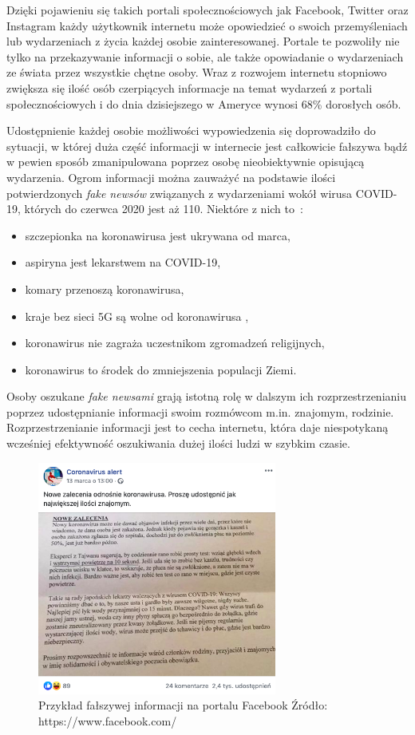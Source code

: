 Dzięki pojawieniu się takich portali społecznościowych jak Facebook, Twitter oraz Instagram każdy użytkownik
internetu może opowiedzieć o swoich przemyśleniach lub wydarzeniach z życia każdej osobie zainteresowanej. Portale te
pozwoliły nie tylko na przekazywanie informacji o sobie, ale także opowiadanie o wydarzeniach ze świata przez wszystkie
chętne osoby. Wraz z rozwojem internetu stopniowo zwiększa się ilość osób czerpiących informacje na temat wydarzeń
z portali społecznościowych i do dnia dzisiejszego w Ameryce wynosi 68\% dorosłych osób. 

Udostępnienie każdej osobie możliwości wypowiedzenia się doprowadziło do sytuacji, w której duża część informacji w internecie
jest całkowicie fałszywa bądź w pewien sposób zmanipulowana poprzez osobę nieobiektywnie opisującą wydarzenia. Ogrom informacji
można zauważyć na podstawie ilości potwierdzonych \textit{fake newsów} związanych z wydarzeniami wokół wirusa COVID-19, których do 
czerwca 2020 jest aż 110. Niektóre z nich to~\cite{Korona}:
\begin{itemize}
    \item szczepionka na koronawirusa jest ukrywana od marca,
    \item aspiryna jest lekarstwem na COVID-19,
    \item komary przenoszą koronawirusa,
    \item kraje bez sieci 5G są wolne od koronawirusa ,
    \item koronawirus nie zagraża uczestnikom zgromadzeń religijnych,
    \item koronawirus to środek do zmniejszenia populacji Ziemi.
\end{itemize}
Osoby oszukane \textit{fake newsami} grają istotną rolę w dalszym ich rozprzestrzenianiu poprzez udostępnianie informacji swoim rozmówcom
m.in. znajomym, rodzinie. Rozprzestrzenianie informacji jest to cecha internetu, która daje niespotykaną wcześniej efektywność oszukiwania dużej ilości ludzi w szybkim
czasie. 
\begin{figure}[h!]
    \centering
    \includegraphics[width=0.7\textwidth]{./Img/cvfakenews.png}
    \caption{Przykład fałszywej informacji na portalu Facebook Źródło: https://www.facebook.com/}
\end{figure}

